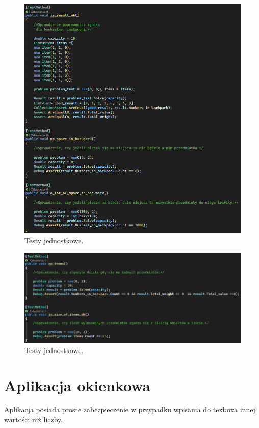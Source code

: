 \documentclass{report}
\begin{document}
\begin{figure}[H]%
	\centering
	\includegraphics[scale=0.5]{zdj/test_second}
	\caption{Testy jednostkowe.}
\end{figure}

\begin{figure}[H]%
	\centering
	\includegraphics[scale=0.6]{zdj/test_third}
	\caption{Testy jednostkowe.}
\end{figure}

\chapter{Aplikacja okienkowa}

Aplikacja posiada proste zabezpieczenie w przypadku wpisania do texboxa innej wartości niż liczby. 
\end{document}
